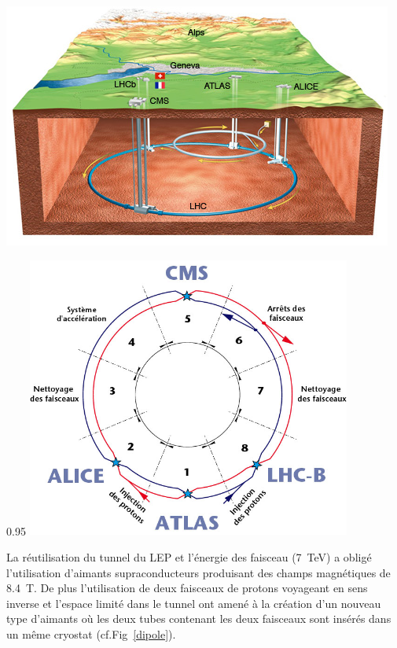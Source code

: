 \begin{minipagewithmarginpars}[ht!]{\textwidth}
  	\centering
  	\vspace*{1cm}
	\includegraphics[scale=0.75]{LHC/CERNMap.jpg}
  	\label{lhcschema}	
\end{minipagewithmarginpars}

\begin{minipagewithmarginpars}[ht!]{0.95\textwidth}
  	\centering
	\includegraphics[width=0.80\textwidth]{LHC/lhc-schematic.jpg}
  	\label{octants}	
\end{minipagewithmarginpars}

La réutilisation du tunnel du LEP et l'énergie des faisceau (\SI{7}{\tera\eV}) a obligé l'utilisation d'aimants supraconducteurs produisant des champs magnétiques de \SI{8.4}{\tesla}. De plus l'utilisation de deux faisceaux de protons voyageant en sens inverse et l'espace limité dans le tunnel ont amené à la création d'un nouveau type d'aimants où les deux tubes contenant les deux faisceaux sont insérés dans un même cryostat (cf.Fig~\ref{dipole}).

